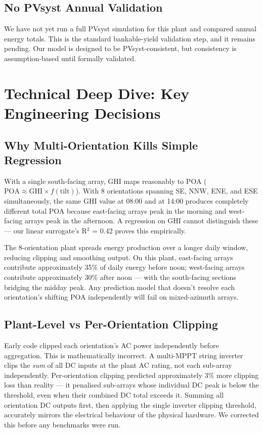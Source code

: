 \documentclass[11pt, a4paper]{article}
\begin{document}
\subsection{No PVsyst Annual Validation}
We have not yet run a full PVsyst simulation for this plant and compared
annual energy totals. This is the standard bankable-yield validation step, and
it remains pending. Our model is designed to be PVsyst-consistent, but
consistency is assumption-based until formally validated.

\section{Technical Deep Dive: Key Engineering Decisions}

\subsection{Why Multi-Orientation Kills Simple Regression}

With a single south-facing array, GHI maps reasonably to POA ($\text{POA}
\approx \text{GHI} \times f(\text{tilt})$). With 8 orientations spanning SE,
NNW, ENE, and ESE simultaneously, the same GHI value at 08:00 and at 14:00
produces completely different total POA because east-facing arrays peak in
the morning and west-facing arrays peak in the afternoon. A regression on GHI
cannot distinguish these --- our linear surrogate's R$^2$ = 0.42 proves this
empirically.

\begin{insightbox}
The 8-orientation plant spreads energy production over a longer daily window,
reducing clipping and smoothing output. On this plant, east-facing arrays
contribute approximately 35\% of daily energy before noon; west-facing arrays
contribute approximately 30\% after noon --- with the south-facing sections
bridging the midday peak. Any prediction model that doesn't resolve each
orientation's shifting POA independently will fail on mixed-azimuth arrays.
\end{insightbox}

\subsection{Plant-Level vs Per-Orientation Clipping}

Early code clipped each orientation's AC power independently before aggregation.
This is mathematically incorrect. A multi-MPPT string inverter clips the
\emph{sum} of all DC inputs at the plant AC rating, not each sub-array
independently. Per-orientation clipping predicted approximately 3\% more
clipping loss than reality --- it penalised sub-arrays whose individual DC
peak is below the threshold, even when their combined DC total exceeds it.
Summing all orientation DC outputs first, then applying the single inverter
clipping threshold, accurately mirrors the electrical behaviour of the physical
hardware. We corrected this before any benchmarks were run.
\end{document}
